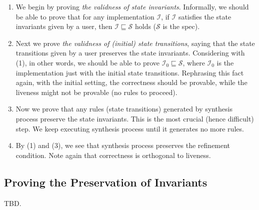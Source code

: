 \documentclass[format=manuscript]{acmart}
\begin{document}
\begin{enumerate}
\item We begin by proving \emph{the validness of state invariants}. Informally,
  we should be able to prove that for any implementation $\mathcal{I}$, if
  $\mathcal{I}$ satisfies the state invariants given by a user, then
  $\mathcal{I} \sqsubseteq \mathcal{S}$ holds ($\mathcal{S}$ is the spec).
\item Next we prove \emph{the validness of (initial) state transitions}, saying
  that the state transitions given by a user preserves the state invariants.
  Considering with (1), in other words, we should be able to prove
  $\mathcal{I}_0 \sqsubseteq \mathcal{S}$, where $\mathcal{I}_0$ is the
  implementation just with the initial state transitions. Rephrasing this fact
  again, with the initial setting, the correctness should be provable, while the
  liveness might not be provable (no rules to proceed).
\item Now we prove that any rules (state transitions) generated by synthesis
  process preserve the state invariants. This is the most crucial (hence
  difficult) step. We keep executing synthesis process until it generates no
  more rules.
\item By (1) and (3), we see that synthesis process preserves the refinement
  condition. Note again that correctness is orthogonal to liveness.
\end{enumerate}

\subsection{Proving the Preservation of Invariants}

TBD.
\end{document}
